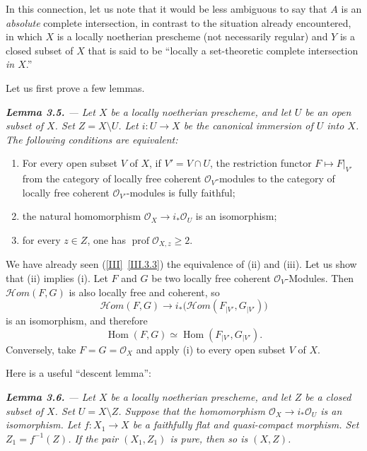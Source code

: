 \documentclass[11pt,a4paper,oneside]{book}
\providecommand{\sisi}[2]{#2}
\providecommand{\Oo}{\mathcal O}
\providecommand{\SheafHom}{\mathcal H\!om}
\providecommand{\OX}{\mathcal O_X}
\providecommand{\Hom}{\operatorname{Hom}}
\providecommand{\prof}{\operatorname{prof}}
\theoremstyle{plain}
\theoremstyle{definition}
\theoremstyle{remark}
\renewcommand{\Ref}[1]{\textup{\ref{#1}}}
\begin{document}
\medskip
\noindent In this connection, let us note that it would be less ambiguous to
say that $A$ is an \emph{absolute} complete intersection, in contrast to the
situation already encountered, in which $X$ is a locally noetherian prescheme
(not necessarily regular) and $Y$ is a closed subset of $X$ that is said to
be ``locally a set-theoretic complete intersection \emph{in $X$}.''

\medskip
\noindent Let us first prove a few lemmas.

\medskip
{\itshape
{}\noindent\textbf{Lemma 3.5.} --- Let $X$ be a locally noetherian prescheme,
and let $U$ be an open subset of $X$. Set $Z=X\setminus U$. Let
$i\colon U\to X$ be the canonical immersion of $U$ into $X$. The following
conditions are equivalent:
\begin{enumerate}[label=\textup{(\roman*)},leftmargin=2.2em,itemsep=0.45em,topsep=0.45em]
\item For every open subset $V$ of $X$, if $V'=V\cap U$, the restriction
functor $F\longmapsto F|_{V'}$ from the category of locally free coherent
$\mathcal O_V$-modules to the category of locally free coherent
$\mathcal O_{V'}$-modules is fully faithful;
\item the natural homomorphism $\mathcal O_X\to i_*\mathcal O_U$ is an
isomorphism;
\item for every $z\in Z$, one has $\prof\mathcal O_{X,z}\geq 2$.
\end{enumerate}
}

We have already seen (\Ref{III}~\Ref{III.3.3}) the equivalence of (ii)
and (iii). Let us show that (ii) implies (i). Let $F$ and $G$ be two
locally free coherent $\Oo_V$-Modules. Then $\SheafHom(F,G)$ is also
locally free and coherent, so
$$
\SheafHom(F,G)\longrightarrow
i_\ast\bigl(\SheafHom(\sisi{F|{|V'}}{F_{|V'}},
\sisi{G|{|V'}}{G_{|V'}})\bigr)
$$
is an isomorphism, and therefore
$$
\Hom(F,G)\simeq
\Hom(\sisi{F|{|V'}}{F_{|V'}},\sisi{G|{|V'}}{G_{|V'}}).
$$
Conversely, take $F=G=\OX$ and apply (i) to every open subset $V$ of
$X$.

\medskip
\noindent Here is a useful ``descent lemma'':

\medskip
{\itshape
{}\noindent\textbf{Lemma 3.6.} --- Let $X$ be a locally noetherian prescheme,
and let $Z$ be a closed subset of $X$. Set $U=X\setminus Z$. Suppose that
the homomorphism $\mathcal O_X\to i_*\mathcal O_U$ is an isomorphism. Let
$f\colon X_1\to X$ be a faithfully flat and quasi-compact morphism. Set
$Z_1=f^{-1}(Z)$. If the pair $(X_1,Z_1)$ is pure, then so is $(X,Z)$.
}
\end{document}
